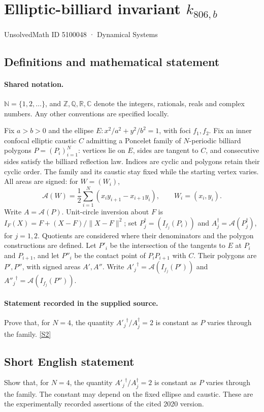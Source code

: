 \documentclass[11pt]{article}
\newcommand{\sref}[2]{\hyperlink{source:#1:#2}{[S#2]}}
\begin{document}
\setcounter{section}{5100047}
\section{Elliptic-billiard invariant $k_{806,b}$}\label{5100048}
{\small\sffamily UnsolvedMath ID 5100048 · Dynamical Systems}
\subsection{Definitions and mathematical statement}

\paragraph{Shared notation.}$\mathbb N=\{1,2,\ldots\}$, and $\mathbb Z,\mathbb Q,\mathbb R,\mathbb C$ denote the integers, rationals, reals and complex numbers. Any other conventions are specified locally.


Fix $a>b>0$ and the ellipse $E:x^2/a^2+y^2/b^2=1$, with foci $f_1,f_2$. Fix an inner confocal elliptic caustic $C$ admitting a Poncelet family of $N$-periodic billiard polygons $P=(P_i)_{i=1}^N$: vertices lie on $E$, sides are tangent to $C$, and consecutive sides satisfy the billiard reflection law. Indices are cyclic and polygons retain their cyclic order. The family and its caustic stay fixed while the starting vertex varies. All areas are signed: for $W=(W_i)$,
\[\mathcal A(W)=\frac12\sum_{i=1}^N(x_i y_{i+1}-x_{i+1}y_i),\qquad W_i=(x_i,y_i).\]
Write $A=\mathcal A(P)$. Unit-circle inversion about $F$ is $I_F(X)=F+(X-F)/\lVert X-F\rVert^2$; set $P_j^\dagger=(I_{f_j}(P_i))$ and $A_j^\dagger=\mathcal A(P_j^\dagger)$, for $j=1,2$. Quotients are considered where their denominators and the polygon constructions are defined. Let $P'_i$ be the intersection of the tangents to $E$ at $P_i$ and $P_{i+1}$, and let $P''_i$ be the contact point of $P_iP_{i+1}$ with $C$. Their polygons are $P',P''$, with signed areas $A',A''$. Write ${A'_j}^\dagger=\mathcal A(I_{f_j}(P'))$ and ${A''_j}^\dagger=\mathcal A(I_{f_j}(P''))$.
\paragraph{Statement recorded in the supplied source.}
Prove that, for $N=4$, the quantity ${A'_j}^\dagger/A_j^\dagger=2$ is constant as $P$ varies through the family. \sref{5100048}{2}
\subsection{Short English statement}
Show that, for $N=4$, the quantity ${A'_j}^\dagger/A_j^\dagger=2$ is constant as $P$ varies through the family. The constant may depend on the fixed ellipse and caustic. These are the experimentally recorded assertions of the cited 2020 version.
\end{document}
